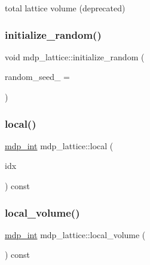 total lattice volume (deprecated) 

\mbox{\label{classmdp__lattice_a1d9c9be3661c7e0ccd05d9c1ed620178}} 
\subsubsection{\texorpdfstring{initialize\+\_\+random()}{initialize\_random()}}
{\footnotesize\ttfamily void mdp\+\_\+lattice\+::initialize\+\_\+random (\begin{DoxyParamCaption}\item[{\hyperlink{mdp__global__vars_8h_aaa1ad9d0dcd2124aa5af0120d9954174}{mdp\+\_\+int}}]{random\+\_\+seed\+\_\+ = {} }\end{DoxyParamCaption})\hspace{0.3cm}{\ttfamily [inline]}}

\mbox{\label{classmdp__lattice_a90cb5cd77128959af52a2efa9ad206f1}} 
\subsubsection{\texorpdfstring{local()}{local()}}
{\footnotesize\ttfamily \hyperlink{mdp__global__vars_8h_aaa1ad9d0dcd2124aa5af0120d9954174}{mdp\+\_\+int} mdp\+\_\+lattice\+::local (\begin{DoxyParamCaption}\item[{\hyperlink{mdp__global__vars_8h_aaa1ad9d0dcd2124aa5af0120d9954174}{mdp\+\_\+int}}]{idx }\end{DoxyParamCaption}) const\hspace{0.3cm}{\ttfamily [inline]}}

\mbox{\label{classmdp__lattice_a403541fd428a4d7245c175dda22fdafd}} 
\subsubsection{\texorpdfstring{local\+\_\+volume()}{local\_volume()}}
{\footnotesize\ttfamily \hyperlink{mdp__global__vars_8h_aaa1ad9d0dcd2124aa5af0120d9954174}{mdp\+\_\+int} mdp\+\_\+lattice\+::local\+\_\+volume (\begin{DoxyParamCaption}{ }\end{DoxyParamCaption}) const\hspace{0.3cm}{\ttfamily [inline]}}



